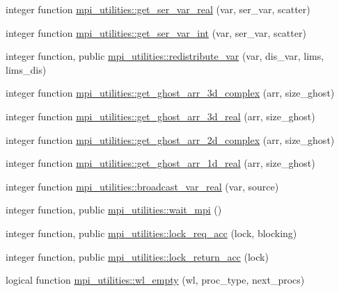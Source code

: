 \begin{DoxyCompactItemize}
\item 
integer function \hyperlink{namespacempi__utilities_a4ecf85687516f8d8d942afe05652d963}{mpi\+\_\+utilities\+::get\+\_\+ser\+\_\+var\+\_\+real} (var, ser\+\_\+var, scatter)
\item 
integer function \hyperlink{namespacempi__utilities_ac8eaaa2c9c0901f0e4ea4679986e8c7d}{mpi\+\_\+utilities\+::get\+\_\+ser\+\_\+var\+\_\+int} (var, ser\+\_\+var, scatter)
\item 
integer function, public \hyperlink{namespacempi__utilities_a128702990bd5fddc582e8fabcffc82b2}{mpi\+\_\+utilities\+::redistribute\+\_\+var} (var, dis\+\_\+var, lims, lims\+\_\+dis)
\item 
integer function \hyperlink{namespacempi__utilities_a2212e8eedabb82df5c9d430fce6a0010}{mpi\+\_\+utilities\+::get\+\_\+ghost\+\_\+arr\+\_\+3d\+\_\+complex} (arr, size\+\_\+ghost)
\item 
integer function \hyperlink{namespacempi__utilities_a01b9221fa05f573cb74027343aa8ff6b}{mpi\+\_\+utilities\+::get\+\_\+ghost\+\_\+arr\+\_\+3d\+\_\+real} (arr, size\+\_\+ghost)
\item 
integer function \hyperlink{namespacempi__utilities_a84112225ce7bf0b3f893b23512be58df}{mpi\+\_\+utilities\+::get\+\_\+ghost\+\_\+arr\+\_\+2d\+\_\+complex} (arr, size\+\_\+ghost)
\item 
integer function \hyperlink{namespacempi__utilities_a298564f1d8c0e8720419a10dca24587a}{mpi\+\_\+utilities\+::get\+\_\+ghost\+\_\+arr\+\_\+1d\+\_\+real} (arr, size\+\_\+ghost)
\item 
integer function \hyperlink{namespacempi__utilities_a7a7d740f6e847cd65e21b4f5d85a0ca7}{mpi\+\_\+utilities\+::broadcast\+\_\+var\+\_\+real} (var, source)
\item 
integer function, public \hyperlink{namespacempi__utilities_a790ea24d32dd0e249541c1e57cd85536}{mpi\+\_\+utilities\+::wait\+\_\+mpi} ()
\item 
integer function, public \hyperlink{namespacempi__utilities_a5a789d05be41d6109c01f46cc98620c8}{mpi\+\_\+utilities\+::lock\+\_\+req\+\_\+acc} (lock, blocking)
\item 
integer function, public \hyperlink{namespacempi__utilities_a86f9982a0f92b51a916f832d9a3d8ba9}{mpi\+\_\+utilities\+::lock\+\_\+return\+\_\+acc} (lock)
\item 
logical function \hyperlink{namespacempi__utilities_a74e2e82b561f403ca8087c3925f76e29}{mpi\+\_\+utilities\+::wl\+\_\+empty} (wl, proc\+\_\+type, next\+\_\+procs)

\end{DoxyCompactItemize}
